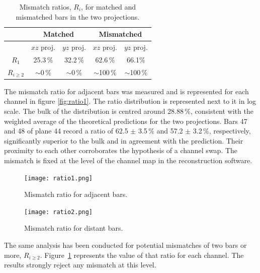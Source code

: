 \documentclass[a4paper,11pt]{article}
\begin{document}
\begin{table}[!h]
 \centering
 \begin{tabular}{c|c|c|c|c}
  & \multicolumn{2}{c|}{Matched} & \multicolumn{2}{c}{Mismatched}  \\
  \hline
  & $xz$ proj. & $yz$ proj. & $xz$ proj. & $yz$ proj. \\
  \hline
  $R_1$ & 25.3\,\% & 32.2\,\% & 62.6\,\% & 66.1\%  \\
  $R_{i\geq2}$ & $\sim$0\,\% & $\sim$0\,\% & $\sim$100\,\% & $\sim$100\,\%
 \end{tabular}
 \caption{Mismatch ratios, $R_i$, for matched and mismatched bars in the two projections.}
 \label{tab:mismatch_ratio}
\end{table}

The mismatch ratio for adjacent bars was measured and is represented for each channel in figure \ref{fig:ratio1}. The ratio distribution is represented next
to it in log scale. The bulk of the distribution is centred around 28.88\,\%, consistent with the weighted average of the theoretical predictions for the two
projections. Bars 47  and 48 of plane 44 record a ratio of 62.5 $\pm$ 3.5\,\% and 57.2 $\pm$ 3.2\,\%, respectively, significantly superior to the bulk and in
agreement with the prediction. Their proximity to each other corroborates the hypothesis of a channel swap. The mismatch is fixed at the level of the channel
map in the reconstruction software.

\begin{figure}[htr!]
  \begin{minipage}[b]{.49\textwidth}
   \centering
   \texttt{[image: ratio1.png]}
   \caption{Mismatch ratio for adjacent bars.}
   \label{fig:ratio1}
  \end{minipage}
  \begin{minipage}[b]{.49\textwidth}
   \centering
   \texttt{[image: ratio2.png]}
   \caption{Mismatch ratio for distant bars.}
   \label{fig:ratio2}
  \end{minipage}
\end{figure}

The same analysis has been conducted for potential mismatches of two bars or more, $R_{i\geq2}$. Figure~\ref{fig:ratio2} represents the value of that ratio
for each channel. The results strongly reject any mismatch at this level.
\end{document}
